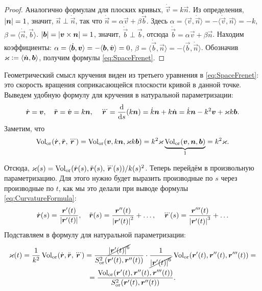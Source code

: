 \begin{proof}
	Аналогично формулам для плоских кривых, $\dot{\vec{v}} = k\vec{n}$. Из определения, $\abs{\vec{n}} = 1$, значит, $\vec{n} \perp \dot{\vec{n}}$, так что $\dot{\vec{n}} = \alpha\vec{v} + \beta\vec{b}$. Здесь $\alpha = \langle\vec{v}, \dot{\vec{n}}\rangle = -\langle\dot{\vec{v}}, \vec{n}\rangle = -k$, $\beta = \langle\dot{\vec{n}}, \vec{b}\rangle$. $\abs{\vec{b}} = \abs{\vec{v} \times \vec{n}} = 1$, значит, $\dot{\vec{b}} \perp \vec{b}$, отсюда $\dot{\vec{b}} = \alpha\vec{v} + \beta\vec{n}$. Находим коэффициенты: $\alpha = \langle \dot{\vec{b}}, \vec{v} \rangle \hm= -\langle\vec{b}, \dot{\vec{v}}\rangle = 0$, $\beta = \langle\dot{\vec{b}}, \vec{n}\rangle = -\langle \vec{b}, \dot{\vec{n}}\rangle$. Обозначив $\varkappa \vcentcolon = \langle\dot{\vec{n}}, \vec{b}\rangle$, получим формулы \eqref{eq:SpaceFrenet}.
\end{proof}

Геометрический смысл кручения виден из третьего уравнения в \eqref{eq:SpaceFrenet}: это скорость вращения соприкасающейся плоскости кривой в данной точке. Выведем удобную формулу для кручения в натуральной параметризации:
\[
	\dot{\vec{r}} = \vec{v},\quad \ddot{\vec{r}} = \dot{\vec{v}} = k\vec{n},\quad \dddot{\vec{r}} = \frac{\d}{\d s}(k\vec{n}) = \dot{k}\vec{n} + k\dot{\vec{n}} = \dot{k}\vec{n} - k^2\vec{v} + \varkappa k\vec{b}.
\]
Заметим, что
\[
	\Vol_{\Or}(\dot{\vec{r}}, \ddot{\vec{r}}, \dddot{\vec{r}}) = \Vol_{\Or}(\vec{v}, k\vec{n}, \varkappa k\vec{b}) = k^2\varkappa \underbrace{\Vol_{\Or}(\vec{v}, \vec{n}, \vec{b})}_1 = k^2\varkappa.
\]

Отсюда, $\varkappa(s) = \Vol_{\Or}(\dot{\vec{r}}(s), \ddot{\vec{r}}(s), \dddot{\vec{r}}(s)) / k(s)^2$. Теперь перейдём в произвольную параметризацию. Для этого нужно будет выразить производные по $s$ через производные по $t$, как мы это делали при выводе формулы \eqref{eq:CurvatureFormula}:
\[
	\dot{\vec{r}}(s) = \frac{\vec{r}^\prime(t)}{\abs{\vec{r}^\prime(t)}},\quad \ddot{\vec{r}}(s) = \frac{\vec{r}^{\prime\prime}(t)}{\abs{\vec{r}^\prime(t)}^2}+ \ldots,\quad \dddot{\vec{r}}(s) = \frac{\vec{r}^{\prime\prime\prime}(t)}{\abs{\vec{r}^\prime(t)}^3} + \ldots
\]
Подставляем в формулу для натуральной параметризации:
\begin{multline} \label{eq:TorsionFormula}
	\varkappa(t) = \frac{1}{k^2}\Vol_{\Or}(\dot{\vec{r}}, \ddot{\vec{r}}, \dddot{\vec{r}}) = \frac{\cancel{\abs{\vec{r}^\prime(t)}^6}}{S^2_{\Or}(\vec{r}^\prime(t), \vec{r}^{\prime\prime}(t))} \cdot \frac{1}{\cancel{\abs{\vec{r}^\prime(t)}^6}}\Vol_{\Or}(\vec{r}^\prime(t), \vec{r}^{\prime\prime}(t), \vec{r}^{\prime\prime\prime}(t)) =\\ = \frac{\Vol_{\Or}(\vec{r}^\prime(t), \vec{r}^{\prime\prime}(t), \vec{r}^{\prime\prime\prime}(t))}{S^2_{\Or}(\vec{r}^\prime(t), \vec{r}^{\prime\prime}(t))}.
\end{multline}

